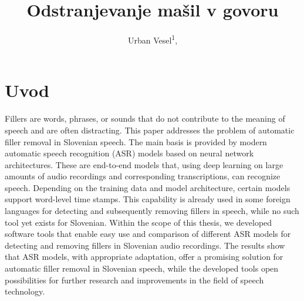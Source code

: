 \documentclass{article}
\title{Odstranjevanje mašil v govoru}
\author{
  Urban Vesel\textsuperscript{1}, 
}
\begin{document}
\maketitle

\begin{abstract}

\end{abstract}
\keywords{}


\section{Uvod}







\newpage
{}
\begin{abstracteng}
Fillers are words, phrases, or sounds that do not contribute to the meaning of speech and are often distracting. 
This paper addresses the problem of automatic filler removal in Slovenian speech. 
The main basis is provided by modern automatic speech recognition (ASR) models based on neural network architectures. 
These are end-to-end models that, using deep learning on large amounts of audio recordings and corresponding transcriptions, can recognize speech. 
Depending on the training data and model architecture, certain models support word-level time stamps. 
This capability is already used in some foreign languages for detecting and subsequently removing fillers in speech, while no such tool yet exists for Slovenian.
Within the scope of this thesis, 
we developed software tools that enable easy use and comparison of different ASR models for detecting and removing fillers in Slovenian audio recordings. 
The results show that ASR models, with appropriate adaptation, offer a promising solution for automatic filler removal in Slovenian speech, 
while the developed tools open possibilities for further research and improvements in the field of speech technology.
\end{abstracteng}

\end{document}

